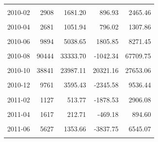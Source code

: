 \begin{longtable}[t]{crrrr}
\cellcolor{gray!10}{2010-01} & \cellcolor{gray!10}{3683} & \cellcolor{gray!10}{1577.93} & \cellcolor{gray!10}{527.67} & \cellcolor{gray!10}{2628.19}\\
2010-02 & 2908 & 1681.20 & 896.93 & 2465.46\\
\cellcolor{gray!10}{2010-03} & \cellcolor{gray!10}{2863} & \cellcolor{gray!10}{1711.81} & \cellcolor{gray!10}{1230.72} & \cellcolor{gray!10}{2192.90}\\
2010-04 & 2681 & 1051.94 & 796.02 & 1307.86\\
\cellcolor{gray!10}{2010-05} & \cellcolor{gray!10}{4196} & \cellcolor{gray!10}{1648.29} & \cellcolor{gray!10}{662.18} & \cellcolor{gray!10}{2634.40}\\
2010-06 & 9894 & 5038.65 & 1805.85 & 8271.45\\
\cellcolor{gray!10}{2010-07} & \cellcolor{gray!10}{21030} & \cellcolor{gray!10}{10430.72} & \cellcolor{gray!10}{6692.68} & \cellcolor{gray!10}{14168.76}\\
2010-08 & 90444 & 33333.70 & -1042.34 & 67709.75\\
\cellcolor{gray!10}{2010-09} & \cellcolor{gray!10}{109030} & \cellcolor{gray!10}{64189.64} & \cellcolor{gray!10}{52588.66} & \cellcolor{gray!10}{75790.62}\\
2010-10 & 38841 & 23987.11 & 20321.16 & 27653.06\\
\cellcolor{gray!10}{2010-11} & \cellcolor{gray!10}{24052} & \cellcolor{gray!10}{13580.03} & \cellcolor{gray!10}{-2981.12} & \cellcolor{gray!10}{30141.19}\\
2010-12 & 9761 & 3595.43 & -2345.58 & 9536.44\\
\cellcolor{gray!10}{2011-01} & \cellcolor{gray!10}{1888} & \cellcolor{gray!10}{342.54} & \cellcolor{gray!10}{-1500.40} & \cellcolor{gray!10}{2185.48}\\
2011-02 & 1127 & 513.77 & -1878.53 & 2906.08\\
\cellcolor{gray!10}{2011-03} & \cellcolor{gray!10}{1265} & \cellcolor{gray!10}{-1010.90} & \cellcolor{gray!10}{-2883.26} & \cellcolor{gray!10}{861.47}\\
2011-04 & 1617 & 212.71 & -469.18 & 894.60\\
\cellcolor{gray!10}{2011-05} & \cellcolor{gray!10}{2625} & \cellcolor{gray!10}{-7.02} & \cellcolor{gray!10}{-1887.06} & \cellcolor{gray!10}{1873.01}\\
2011-06 & 5627 & 1353.66 & -3837.75 & 6545.07\\
\cellcolor{gray!10}{2011-07} & \cellcolor{gray!10}{9768} & \cellcolor{gray!10}{2593.53} & \cellcolor{gray!10}{-5896.58} & \cellcolor{gray!10}{11083.64}\\

\end{longtable}
